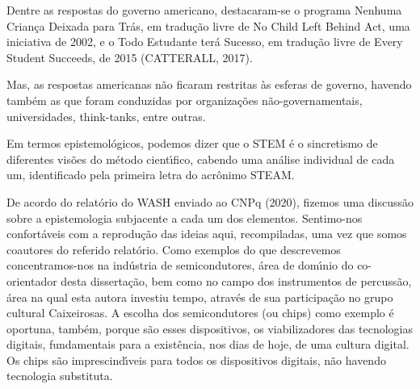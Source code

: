 \documentclass[
12pt,		%
openright,	%
twoside,  %
a4paper,			%
chapter=TITLE,		%
english,			%
french,				%
spanish,			%
brazil				%
]{USPSC-classe/USPSC}
\begin{document}
Dentre as respostas do governo americano, destacaram-se o programa \textquotedbl Nenhuma Crian\c{c}a Deixada para Tr\'as\textquotedbl , em tradu\c{c}\~ao livre de \textquotedbl No Child Left Behind Act\textquotedbl , uma iniciativa de 2002, e o \textquotedbl Todo Estudante ter\'a Sucesso\textquotedbl , em tradu\c{c}\~ao livre de \textquotedbl Every Student Succeeds\textquotedbl , de 2015  (CATTERALL, 2017).

















Mas, as respostas americanas n\~ao ficaram restritas \`as esferas de governo, havendo tamb\'em as que foram conduzidas por organiza\c{c}\~oes n\~ao-governamentais, universidades, think-tanks, entre outras.

















Em termos epistemol\'ogicos, podemos dizer que o STEM \'e o sincretismo de diferentes vis\~oes do m\'etodo cient\'{\i}fico, cabendo uma an\'alise individual de cada um, identificado pela primeira letra do acr\^onimo STEAM.

















De acordo do relat\'orio do WASH enviado ao CNPq (2020), fizemos uma discuss\~ao sobre a epistemologia subjacente a cada um dos elementos. Sentimo-nos confort\'aveis com a reprodu\c{c}\~ao das ideias aqui, recompiladas, uma vez que somos coautores do referido relat\'orio. Como exemplos do que descrevemos concentramos-nos na ind\'ustria de semicondutores, \'area de dom\'{\i}nio do co-orientador desta disserta\c{c}\~ao, bem como no campo dos instrumentos de percuss\~ao, \'area na qual esta autora investiu tempo, atrav\'es de sua participa\c{c}\~ao no grupo cultural \textquotedbl Caixeirosas\textquotedbl . A escolha dos semicondutores (ou chips) como exemplo \'e oportuna, tamb\'em, porque s\~ao esses dispositivos, os viabilizadores das tecnologias digitais, fundamentais para a exist\^encia, nos dias de hoje, de uma \textquotedbl cultura digital\textquotedbl . Os chips s\~ao imprescind\'{\i}veis para todos os dispositivos digitais, n\~ao havendo tecnologia substituta.
\end{document}
